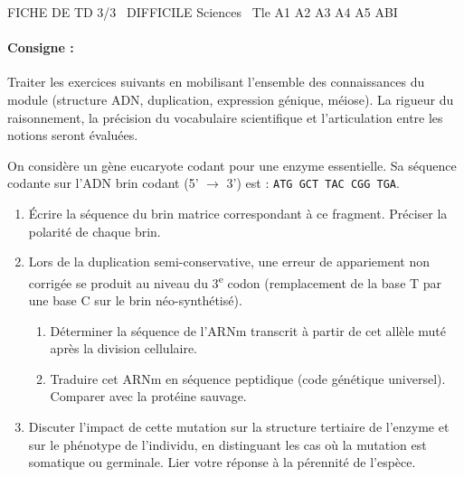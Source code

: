 \documentclass[11pt]{article}
\begin{document}
\begin{tcolorbox}[enhanced,colback=popink,colframe=popink,arc=10pt,boxrule=0pt,left=12pt,right=12pt,top=9pt,bottom=9pt]
{\color{white}\popxbold\small FICHE DE TD 3/3 \textbullet\ DIFFICILE \hfill Sciences \textbullet\ Tle A1 A2 A3 A4 A5 ABI\par}
\end{tcolorbox}
\vspace{4pt}
\paragraph{Consigne :} Traiter les exercices suivants en mobilisant l'ensemble des connaissances du module (structure ADN, duplication, expression génique, méiose). La rigueur du raisonnement, la précision du vocabulaire scientifique et l'articulation entre les notions seront évaluées.

\begin{exercice}
On considère un gène eucaryote codant pour une enzyme essentielle. Sa séquence codante sur l'ADN brin codant (5' $\to$ 3') est : \texttt{ATG GCT TAC CGG TGA}. 
\begin{enumerate}
    \item Écrire la séquence du brin matrice correspondant à ce fragment. Préciser la polarité de chaque brin.
    \item Lors de la duplication semi-conservative, une erreur de appariement non corrigée se produit au niveau du 3\textsuperscript{e} codon (remplacement de la base T par une base C sur le brin néo-synthétisé). 
    \begin{enumerate}
        \item Déterminer la séquence de l'ARNm transcrit à partir de cet allèle muté après la division cellulaire.
        \item Traduire cet ARNm en séquence peptidique (code génétique universel). Comparer avec la protéine sauvage.
    \end{enumerate}
    \item Discuter l'impact de cette mutation sur la structure tertiaire de l'enzyme et sur le phénotype de l'individu, en distinguant les cas où la mutation est somatique ou germinale. Lier votre réponse à la pérennité de l'espèce.
\end{enumerate}
\end{exercice}
\end{document}
